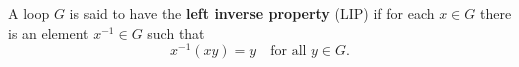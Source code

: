 A loop $G$ is said to have the \textbf{left inverse property} (LIP) if for each $x \in G$ there is an element $x^{-1} \in G$ such that
$$x^{-1}(xy) = y \quad \text{for all } y \in G.$$
